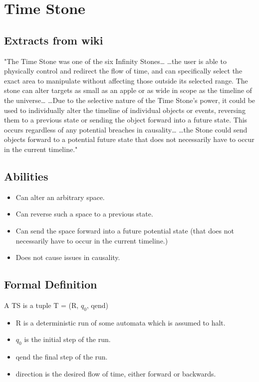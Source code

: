 \documentclass{report}
\begin{document}
\chapter{Time Stone}

\section{Extracts from wiki}

"The Time Stone was one of the six Infinity Stones… …the user is able to physically control and redirect the flow of time, and can specifically select the exact area to manipulate without affecting those outside its selected range. The stone can alter targets as small as an apple or as wide in scope as the timeline of the universe… …Due to the selective nature of the Time Stone's power, it could be used to individually alter the timeline of individual objects or events, reversing them to a previous state or sending the object forward into a future state. This occurs regardless of any potential breaches in causality… …the Stone could send objects forward to a potential future state that does not necessarily have to occur in the current timeline."

\section{Abilities}

\begin{itemize}
  \item Can alter an arbitrary space.
  \item Can reverse such a space to a previous state.
  \item Can send the space forward into a future potential state (that does not necessarily have to occur in the current timeline.)
  \item Does not cause issues in causality.
\end{itemize}

\section{Formal Definition}

A TS is a tuple T = (R, $q_0$, qend)

\begin{itemize}
  \item R is a deterministic run of some automata which is assumed to halt.
  \item $q_0$ is the initial step of the run.
  \item qend the final step of the run.
  \item direction is the desired flow of time, either forward or backwards.
\end{itemize}
\end{document}
